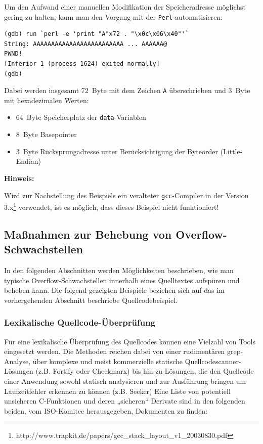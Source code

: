 Um den Aufwand einer manuellen Modifikation der Speicheradresse 
möglichst gering zu halten, kann man den Vorgang mit der \texttt{Perl} 
automatisieren:

\begin{lstlisting}[basicstyle=\ttfamily\footnotesize]
(gdb) run `perl -e 'print "A"x72 . "\x0c\x06\x40"'`
String: AAAAAAAAAAAAAAAAAAAAAAAAA ... AAAAAA@
PWND!
[Inferior 1 (process 1624) exited normally]
(gdb)
\end{lstlisting}

Dabei werden insgesamt \SI{72}{Byte} mit dem Zeichen \texttt{A} 
überschrieben und \SI{3}{Byte} mit hexadezimalen Werten:

\begin{itemize}
      \item \SI{64}{Byte} Speicherplatz der \texttt{data}-Variablen    
      \item \SI{8}{Byte} Basepointer
      \item \SI{3}{Byte} Rücksprungadresse unter Berücksichtigung der Byteorder (Little-Endian)
\end{itemize}

\textbf{Hinweis:}

Wird zur Nachstellung des Beispiels ein veralteter \texttt{gcc}-Compiler 
in der Version 3.x\footnote{http://www.trapkit.de/papers/gcc\_stack\_layout\_v1\_20030830.pdf} 
verwendet, ist es möglich, dass dieses Beispiel nicht funktioniert!

\subsection{Maßnahmen zur Behebung von Overflow-Schwachstellen}

In den folgenden Abschnitten werden Möglichkeiten beschrieben, wie man 
typische Overflow-Schwachstellen innerhalb eines Quelltextes aufspüren 
und beheben kann. Die folgend gezeigten Beispiele beziehen sich auf das 
im vorhergehenden Abschnitt beschriebe Quellcodebeispiel.

\subsubsection{Lexikalische Quellcode-Überprüfung}

Für eine lexikalische Überprüfung des Quellcodes können eine Vielzahl 
von Tools eingesetzt werden. Die Methoden reichen dabei von einer 
rudimentären grep-Analyse, über komplexe und meist kommerzielle 
statische Quellcodescanner-Lösungen (z.B. Fortify oder Checkmarx) 
bis hin zu Lösungen, die den Quellcode einer Anwendung sowohl statisch 
analysieren und zur Ausführung bringen um Laufzeitfehler erkennen zu 
können (z.B. Seeker)
Eine Liste von potentiell unsicheren C-Funktionen und deren „sicheren“ 
Derivate sind in den folgenden beiden, vom ISO-Komitee herausgegeben, 
Dokumenten zu finden:

